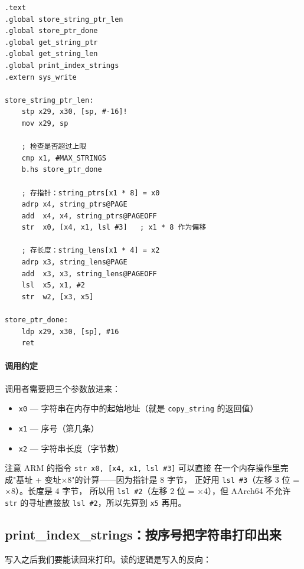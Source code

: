 \begin{lstlisting}[style=asm,caption=string\_array.s — store\_string\_ptr\_len]
.text
.global store_string_ptr_len
.global store_ptr_done
.global get_string_ptr
.global get_string_len
.global print_index_strings
.extern sys_write

store_string_ptr_len:
    stp x29, x30, [sp, #-16]!
    mov x29, sp

    ; 检查是否超过上限
    cmp x1, #MAX_STRINGS
    b.hs store_ptr_done

    ; 存指针：string_ptrs[x1 * 8] = x0
    adrp x4, string_ptrs@PAGE
    add  x4, x4, string_ptrs@PAGEOFF
    str  x0, [x4, x1, lsl #3]   ; x1 * 8 作为偏移

    ; 存长度：string_lens[x1 * 4] = x2
    adrp x3, string_lens@PAGE
    add  x3, x3, string_lens@PAGEOFF
    lsl  x5, x1, #2
    str  w2, [x3, x5]

store_ptr_done:
    ldp x29, x30, [sp], #16
    ret
\end{lstlisting}

\paragraph{调用约定}
调用者需要把三个参数放进来：
\begin{itemize}
    \item \texttt{x0} — 字符串在内存中的起始地址（就是 \texttt{copy\_string} 的返回值）
    \item \texttt{x1} — 序号（第几条）
    \item \texttt{x2} — 字符串长度（字节数）
\end{itemize}

注意 ARM 的指令 \texttt{str x0, [x4, x1, lsl \#3]} 可以直接
在一个内存操作里完成"基址 + 变址×8"的计算——因为指针是 8 字节，
正好用 \texttt{lsl \#3}（左移 3 位 = ×8）。长度是 4 字节，
所以用 \texttt{lsl \#2}（左移 2 位 = ×4），但 AArch64 不允许
\texttt{str} 的寻址直接放 \texttt{lsl \#2}，所以先算到 \texttt{x5} 再用。

\subsection{print\_index\_strings：按序号把字符串打印出来}

写入之后我们要能读回来打印。读的逻辑是写入的反向：


